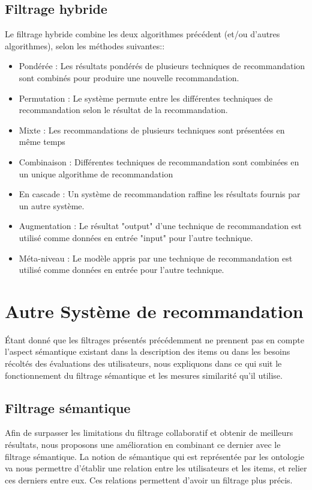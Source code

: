 \documentclass[a4paper,12pt,letterpaper,headsepline,singlespacing,headsepline, french]{report}
\begin{document}
\subsection{Filtrage hybride}
Le filtrage hybride combine les deux algorithmes précédent (et/ou d'autres algorithmes), selon les méthodes suivantes:\cite{ref12}:
\begin{itemize}
	\item Pondérée : Les résultats pondérés de plusieurs techniques de recommandation sont combinés pour produire une nouvelle recommandation.
	\item Permutation : Le système permute entre les différentes techniques de recommandation selon le résultat de la recommandation.
	\item Mixte : Les recommandations de plusieurs techniques sont présentées en même temps
	\item  Combinaison : Différentes techniques de recommandation sont combinées en un unique algorithme de recommandation
	\item  En cascade : Un système de recommandation raffine les résultats fournis par un autre système.
	\item Augmentation : Le résultat "output" d'une technique de recommandation est utilisé comme données en entrée "input" pour l'autre technique.
	\item Méta-niveau : Le modèle appris par une technique de recommandation est utilisé comme données en entrée pour l'autre technique.
\end{itemize}
\section{Autre Système de recommandation}
Étant donné que les filtrages présentés précédemment ne prennent pas en compte l’aspect sémantique existant dans la description des items ou dans les besoins récoltés des évaluations des utilisateurs, nous expliquons dans ce qui suit le fonctionnement du filtrage sémantique et les mesures similarité qu'il utilise.
\subsection{Filtrage sémantique}
Afin de surpasser les limitations du filtrage collaboratif et obtenir de meilleurs résultats, nous proposons une amélioration en combinant ce dernier avec le filtrage sémantique. La notion de sémantique qui est représentée par les ontologie va nous permettre d’établir une relation entre les utilisateurs et les items, et relier ces derniers entre eux. Ces relations permettent d'avoir un filtrage plus précis.
\end{document}
